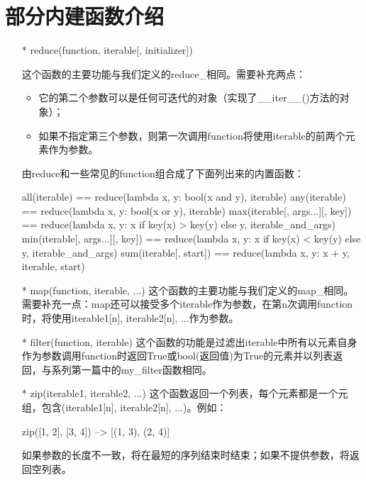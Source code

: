 \documentclass[12pt,a4paper]{report}
\begin{document}
\section{部分内建函数介绍}
\begin{itemize}
    \item[*]reduce(function, iterable[, initializer]) 
        
        这个函数的主要功能与我们定义的reduce\_相同。需要补充两点：
        \begin{itemize}
            \item 它的第二个参数可以是任何可迭代的对象（实现了\_\_iter\_\_()方法的对象）；
            \item 如果不指定第三个参数，则第一次调用function将使用iterable的前两个元素作为参数。
        \end{itemize}
        由reduce和一些常见的function组合成了下面列出来的内置函数： 
\begin{python}[moreemph={[4]42},caption={},label=ex1]
all(iterable) == 
    reduce(lambda x, y: bool(x and y), iterable)
any(iterable) == 
    reduce(lambda x, y: bool(x or y), iterable)
max(iterable[, args...][, key]) == 
    reduce(lambda x, y: x if key(x) > key(y) else y,
    iterable_and_args)
min(iterable[, args...][, key]) == 
    reduce(lambda x, y: x if key(x) < key(y) else y,
    iterable_and_args)
sum(iterable[, start]) == reduce(lambda x, y: x + y,
    iterable, start)
\end{python} 

    \item[*]map(function, iterable, ...)
        这个函数的主要功能与我们定义的map\_相同。需要补充一点：map还可以接受多个iterable作为参数，在第n次调用function时，将使用iterable1[n], iterable2[n], ...作为参数。
        
    \item[*]filter(function, iterable)
        这个函数的功能是过滤出iterable中所有以元素自身作为参数调用function时返回True或bool(返回值)为True的元素并以列表返回，与系列第一篇中的my\_filter函数相同。

    \item[*]zip(iterable1, iterable2, ...)
        这个函数返回一个列表，每个元素都是一个元组，包含(iterable1[n], iterable2[n], ...)。例如：
        \begin{python}[moreemph={[4]42},caption={},label=ex1]
zip([1, 2], [3, 4]) --> [(1, 3), (2, 4)]
        \end{python} 
        如果参数的长度不一致，将在最短的序列结束时结束；如果不提供参数，将返回空列表。
\end{itemize}
\end{document}
